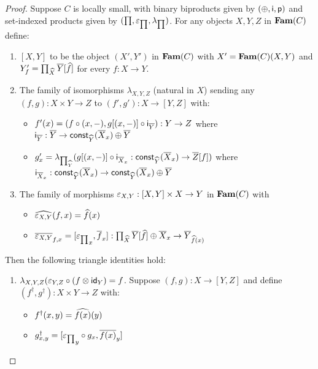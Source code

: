 \begin{proof}
Suppose $C$ is locally small, with binary biproducts given by $(\oplus,\mathsf{i},\mathsf{p})$ and set-indexed products
given by $(\prod,\varepsilon_{\prod},\lambda_{\prod})$. For any objects $X, Y, Z$ in $\mathbf{Fam}(C)$ define:

\begin{enumerate}
\item $[X, Y]$ to be the object $(X',Y')$ in $\mathbf{Fam}(C)$ with $X' = \mathbf{Fam}(C)(X,Y)$ and $Y'_f =
\prod_{\widehat{X}}\overline{Y}[\widehat{f}]$ for every $f: X \to Y$.
\item The family of isomorphisms $\lambda_{X,Y,Z}$ (natural in $X$) sending any $(f, g): X \times Y \to Z$ to
$(f', g'): X \to [Y, Z]$ with:
\begin{itemize}
\item $f'(x) = (f \circ (x, -), g[(x,-)] \circ \mathsf{i}_{\overline{Y}}):
Y \to Z$ where $\mathsf{i}_{\overline{Y}}: \overline{Y} \to \mathsf{const}_{\widehat{Y}}(\overline{X}_x) \oplus \overline{Y}$
\item $g'_x = \lambda_{\prod_{\widehat{Y}}}(g[(x,-)] \circ \mathsf{i}_{\overline{X}_x}:
\mathsf{const}_{\widehat{Y}}(\overline{X}_x) \to \overline{Z}[f])$ where $\mathsf{i}_{\overline{X}_x}: \mathsf{const}_{\widehat{Y}}(\overline{X}_x)
\to \mathsf{const}_{\widehat{Y}}(\overline{X}_x) \oplus \overline{Y}$
\end{itemize}
\item The family of morphisms $\varepsilon_{X,Y}: [X, Y] \times X \to Y$ in $\mathbf{Fam}(C)$ with
\begin{itemize}
\item $\widehat{\varepsilon_{X,Y}}(f, x) = \widehat{f}(x)$
\item $\overline{\varepsilon_{X,Y}}_{f, x} = [{\varepsilon_{\prod}}_x, \overline{f}_x]:
\prod_{\widehat{X}}\overline{Y}[\widehat{f}] \oplus \overline{X}_x \to \overline{Y}_{\widehat{f}(x)}$
\end{itemize}
\end{enumerate}

Then the following triangle identities hold:
\begin{enumerate}
\item $\lambda_{X,Y,Z}(\varepsilon_{Y,Z} \circ (f \otimes \mathsf{id}_Y) = f$. Suppose $(f,g): X \to [Y,Z]$ and define
$(f^\dagger, g^\dagger): X \times Y \to Z$ with:
\begin{itemize}
\item $f^\dagger(x,y) = \widehat{f(x)}(y)$
\item $g^\dagger_{x,y} = [{\varepsilon_{\prod}}_y \circ g_x, \overline{f(x)}_y]$
\end{itemize}


\end{enumerate}
\end{proof}
